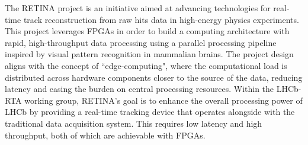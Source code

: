 The RETINA project\cite{Lazzari:2801062} is an initiative aimed at advancing technologies for real-time track reconstruction from raw hits data in high-energy physics experiments. This project leverages FPGAs in order to build a computing architecture with rapid, high-throughput data processing using a parallel processing pipeline inspired by visual pattern recognition in mammalian brains. The project design aligns with the concept of ``edge-computing", where the computational load is distributed across hardware components closer to the source of the data, reducing latency and easing the burden on central processing resources.
Within the LHCb-RTA working group, RETINA’s goal is to enhance the overall processing power of LHCb by providing a real-time tracking device that operates alongside with the traditional data acquisition system. This requires low latency and high throughput, both of which are achievable with FPGAs. 


